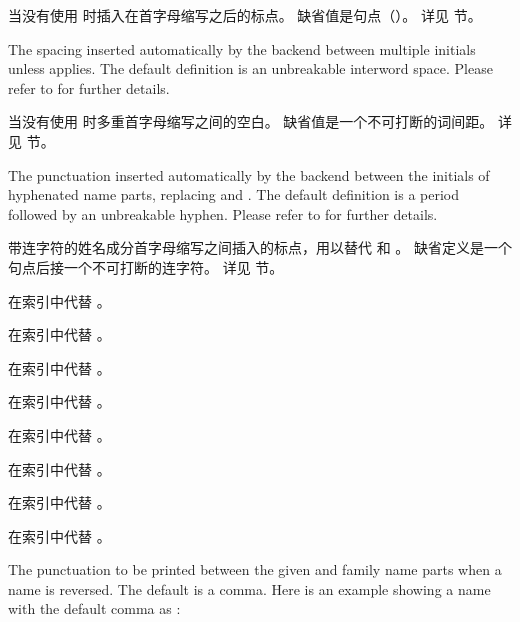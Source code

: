 \begin{ltxsyntax}
当没有使用  时插入在首字母缩写之后的标点。
缺省值是句点（）。
详见  节。

The spacing inserted automatically by the backend between multiple initials unless  applies. The default definition is an unbreakable interword space. Please refer to  for further details.


当没有使用  时多重首字母缩写之间的空白。
缺省值是一个不可打断的词间距。
详见  节。

The punctuation inserted automatically by the backend between the initials of hyphenated name parts, replacing  and . The default definition is a period followed by an unbreakable hyphen. Please refer to  for further details.


带连字符的姓名成分首字母缩写之间插入的标点，用以替代  和 。
缺省定义是一个句点后接一个不可打断的连字符。
详见  节。

在索引中代替 。

在索引中代替 。

在索引中代替 。

在索引中代替 。

在索引中代替 。

在索引中代替 。

在索引中代替 。

在索引中代替 。

The punctuation to be printed between the given and family name parts when a name is reversed. The default is a comma. Here is an example showing a name with the default comma as :



\end{ltxsyntax}

